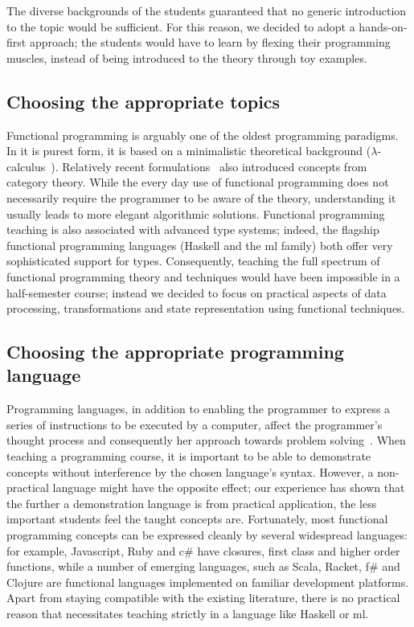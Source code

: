 \documentclass[conference]{IEEEtran}
\begin{document}
The diverse backgrounds of the students guaranteed that no generic
introduction to the topic would be sufficient. For this reason, we decided
to adopt a hands-on-first approach; the students would have to learn by
flexing their programming muscles, instead of being introduced to 
the theory through toy examples.

\subsection{Choosing the appropriate topics}

Functional programming is arguably one of the oldest programming paradigms. In it is
purest form, it is based on a minimalistic theoretical background
($\lambda$-calculus~\cite{Baren84}). Relatively recent
formulations~\cite{Meije91, Wadle93} also introduced concepts from category
theory. While the every day use of functional programming does not necessarily
require the programmer to be aware of the theory, understanding it usually leads
to more elegant algorithmic solutions. Functional programming teaching is also
associated with advanced type systems; indeed, the flagship functional
programming languages (Haskell and the {\sc ml} family) both offer very
sophisticated support for types. Consequently, teaching the full spectrum of
functional programming theory and techniques would have been impossible in a
half-semester course; instead we decided to focus on practical aspects of data
processing, transformations and state representation using functional
techniques.

\subsection{Choosing the appropriate programming language}

Programming languages, in addition to enabling the programmer to express a
series of instructions to be executed by a computer, affect the programmer's
thought process and consequently her approach towards problem
solving~\cite{Ivers80}.  When teaching a programming course, it is important to
be able to demonstrate concepts without interference by the chosen language's
syntax. However, a non-practical language might have the opposite effect; our
experience has shown that the further a demonstration language is from practical
application, the less important students feel the taught concepts are.
Fortunately, most functional programming concepts can be expressed cleanly by
several widespread languages: for example, Javascript, Ruby and {\sc c\#} have
closures, first class and higher order functions, while a number of emerging
languages, such as Scala, Racket, {\sc f\#} and Clojure are functional languages
implemented on familiar development platforms. Apart from staying compatible
with the existing literature, there is no practical reason that necessitates
teaching strictly in a language like Haskell or {\sc ml}.
\end{document}
